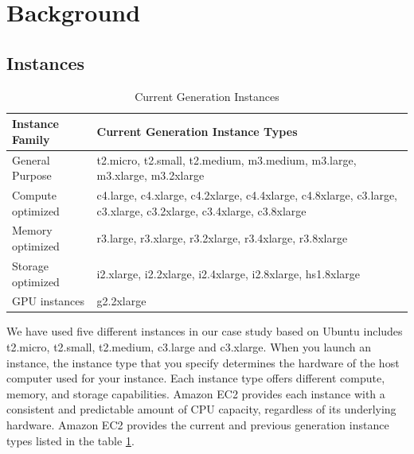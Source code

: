 \documentclass[10pt, conference]{IEEEtran}
\begin{document}
\section{Background}
\label{sec:backgr-relat-work}

\subsection{Instances}
\begin{table}
\begin{center}
\begin{tabular}{|l|l| }
  \hline
  Instance Family & Current Generation Instance Types \\
  \hline
  General Purpose & t2.micro, t2.small, t2.medium,  m3.medium, m3.large, m3.xlarge, m3.2xlarge \\
  Compute optimized &  c4.large, c4.xlarge, c4.2xlarge, c4.4xlarge, c4.8xlarge, c3.large,  c3.xlarge, c3.2xlarge, c3.4xlarge, c3.8xlarge\\
  Memory optimized & r3.large, r3.xlarge, r3.2xlarge, r3.4xlarge, r3.8xlarge \\
  Storage optimized & i2.xlarge, i2.2xlarge, i2.4xlarge, i2.8xlarge, hs1.8xlarge \\
  GPU instances & g2.2xlarge \\
  \hline
\end{tabular}
\caption{\label{table:instancess} Current Generation Instances}
\end{center}
\end{table}


We have used five different instances in our case study based on Ubuntu includes t2.micro, t2.small, t2.medium, c3.large and c3.xlarge. When you launch an instance, the instance type that you specify determines the hardware of the host computer used for your instance. Each instance type offers different compute, memory, and storage capabilities. Amazon EC2 provides each instance with a consistent and predictable amount of CPU capacity, regardless of its underlying hardware. Amazon EC2 provides the current and previous generation instance types listed in the table \ref{table:instancess}.  
\end{document}
